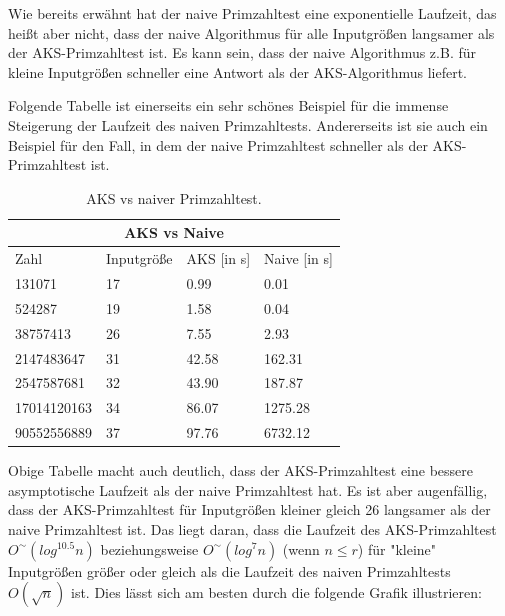 \documentclass[12pt,oneside]{article}
\theoremstyle{remark}
\theoremstyle{definition}
\begin{document}
Wie bereits erwähnt hat der naive Primzahltest eine exponentielle Laufzeit, das heißt aber nicht, dass der naive Algorithmus für alle Inputgrößen langsamer als der AKS-Primzahltest ist. Es kann sein, dass der naive Algorithmus z.B. für kleine Inputgrößen schneller eine Antwort als der AKS-Algorithmus liefert.\newline

Folgende Tabelle ist einerseits ein sehr schönes Beispiel für die immense Steigerung der Laufzeit des naiven Primzahltests. Andererseits ist sie auch ein Beispiel für den Fall, in dem der naive Primzahltest schneller als der AKS-Primzahltest ist. 
\begin{table}[h!]
\centering
\begin{tabular}{ |p{3cm}||p{3cm}|p{3cm}|p{3cm}|  }
 \hline
 \multicolumn{4}{|c|}{AKS vs Naive} \\
 \hline
 Zahl & Inputgröße  & AKS [in s] &Naive [in s]\\
 \hline
 131071&   17  & 0.99   &0.01\\
 524287 &19 &  1.58& 0.04\\
 38757413    &26 & 7.55&   2.93\\
 2147483647& 31  & 42.58   &162.31\\
 2547587681& 32  &  43.90&  187.87\\
 17014120163&   34  & 86.07& 1275.28\\
 90552556889&   37  & 97.76& 6732.12\\

 \hline
\end{tabular}
 \caption{AKS vs naiver Primzahltest.}
\label{table:4}
\end{table}



Obige Tabelle macht auch deutlich, dass der AKS-Primzahltest eine bessere asymptotische Laufzeit als der naive Primzahltest hat. Es ist aber augenfällig, dass der AKS-Primzahltest für Inputgrößen kleiner gleich 26 langsamer als der naive Primzahltest ist. Das liegt daran, dass die Laufzeit des AKS-Primzahltest $O^{\sim}(log^{10.5}n)$ beziehungsweise $O^{\sim}(log^7n)$ (wenn $n \leq r$) für "kleine" $ $ Inputgrößen größer oder gleich als die Laufzeit des naiven Primzahltests $O(\sqrt{n})$ ist. Dies lässt sich am besten durch die folgende Grafik illustrieren: 
\end{document}
